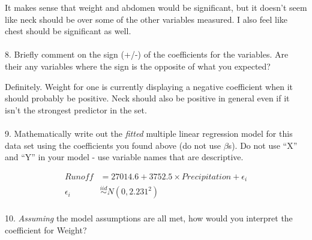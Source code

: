 \documentclass[
  letterpaper,
  DIV=11,
  numbers=noendperiod]{scrartcl}
\makeatletter
\let\oldparagraph\paragraph
\renewcommand{\paragraph}{
    \@ifstar
      \xxxParagraphStar
      \xxxParagraphNoStar
  }
\newcommand{\xxxParagraphStar}[1]{\oldparagraph*{#1}\mbox{}}
\newcommand{\xxxParagraphNoStar}[1]{\oldparagraph{#1}\mbox{}}
\makeatother
\begin{document}
It makes sense that weight and abdomen would be significant, but it
doesn't seem like neck should be over some of the other variables
measured. I also feel like chest should be significant as well.

\paragraph{8. Briefly comment on the sign (+/-) of the coefficients for
the variables. Are their any variables where the sign is the opposite of
what you
expected?}\label{briefly-comment-on-the-sign---of-the-coefficients-for-the-variables.-are-their-any-variables-where-the-sign-is-the-opposite-of-what-you-expected}

Definitely. Weight for one is currently displaying a negative
coefficient when it should probably be positive. Neck should also be
positive in general even if it isn't the strongest predictor in the set.

\paragraph{\texorpdfstring{9. Mathematically write out the \emph{fitted}
multiple linear regression model for this data set using the
coefficients you found above (do not use \(\beta\)s). Do not use ``X''
and ``Y'' in your model - use variable names that are
descriptive.}{9. Mathematically write out the fitted multiple linear regression model for this data set using the coefficients you found above (do not use \textbackslash betas). Do not use ``X'' and ``Y'' in your model - use variable names that are descriptive.}}\label{mathematically-write-out-the-fitted-multiple-linear-regression-model-for-this-data-set-using-the-coefficients-you-found-above-do-not-use-betas.-do-not-use-x-and-y-in-your-model---use-variable-names-that-are-descriptive.}

\[\begin{align}
    Runoff &= 27014.6 + 3752.5 \times Precipitation + \epsilon_i \\ 
    \epsilon_i &\stackrel{iid}{\sim} N(0, 2.231^2) 
    \end{align} \]

\paragraph{\texorpdfstring{10. \emph{Assuming} the model assumptions are
all met, how would you interpret the coefficient for
Weight?}{10. Assuming the model assumptions are all met, how would you interpret the coefficient for Weight?}}\label{assuming-the-model-assumptions-are-all-met-how-would-you-interpret-the-coefficient-for-weight}
\end{document}
